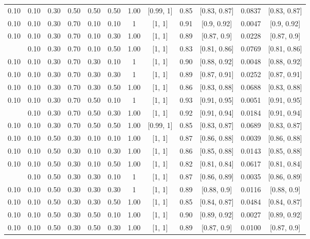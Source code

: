 \documentclass[
  11pt,
]{article}
\begin{document}
\begin{landscape}
\begin{ThreePartTable}
\begin{longtable}[t]{cccccccccccc}
0.10 & 0.10 & 0.30 & 0.50 & 0.50 & 0.50 & 1.00 & {}[0.99, 1] & 0.85 & {}[0.83, 0.87] & 0.0837 & {}[0.83, 0.87]\\
0.10 & 0.10 & 0.30 & 0.70 & 0.10 & 0.10 & 1 & {}[1, 1] & 0.91 & {}[0.9, 0.92] & 0.0047 & {}[0.9, 0.92]\\
0.10 & 0.10 & 0.30 & 0.70 & 0.10 & 0.30 & 1.00 & {}[1, 1] & 0.89 & {}[0.87, 0.9] & 0.0228 & {}[0.87, 0.9]\\
\addlinespace
0.10 & 0.10 & 0.30 & 0.70 & 0.10 & 0.50 & 1.00 & {}[1, 1] & 0.83 & {}[0.81, 0.86] & 0.0769 & {}[0.81, 0.86]\\
0.10 & 0.10 & 0.30 & 0.70 & 0.30 & 0.10 & 1 & {}[1, 1] & 0.90 & {}[0.88, 0.92] & 0.0048 & {}[0.88, 0.92]\\
0.10 & 0.10 & 0.30 & 0.70 & 0.30 & 0.30 & 1 & {}[1, 1] & 0.89 & {}[0.87, 0.91] & 0.0252 & {}[0.87, 0.91]\\
0.10 & 0.10 & 0.30 & 0.70 & 0.30 & 0.50 & 1.00 & {}[1, 1] & 0.86 & {}[0.83, 0.88] & 0.0688 & {}[0.83, 0.88]\\
0.10 & 0.10 & 0.30 & 0.70 & 0.50 & 0.10 & 1 & {}[1, 1] & 0.93 & {}[0.91, 0.95] & 0.0051 & {}[0.91, 0.95]\\
\addlinespace
0.10 & 0.10 & 0.30 & 0.70 & 0.50 & 0.30 & 1.00 & {}[1, 1] & 0.92 & {}[0.91, 0.94] & 0.0184 & {}[0.91, 0.94]\\
0.10 & 0.10 & 0.30 & 0.70 & 0.50 & 0.50 & 1.00 & {}[0.99, 1] & 0.85 & {}[0.83, 0.87] & 0.0689 & {}[0.83, 0.87]\\
0.10 & 0.10 & 0.50 & 0.30 & 0.10 & 0.10 & 1.00 & {}[1, 1] & 0.87 & {}[0.86, 0.88] & 0.0039 & {}[0.86, 0.88]\\
0.10 & 0.10 & 0.50 & 0.30 & 0.10 & 0.30 & 1.00 & {}[1, 1] & 0.86 & {}[0.85, 0.88] & 0.0143 & {}[0.85, 0.88]\\
0.10 & 0.10 & 0.50 & 0.30 & 0.10 & 0.50 & 1.00 & {}[1, 1] & 0.82 & {}[0.81, 0.84] & 0.0617 & {}[0.81, 0.84]\\
\addlinespace
0.10 & 0.10 & 0.50 & 0.30 & 0.30 & 0.10 & 1 & {}[1, 1] & 0.87 & {}[0.86, 0.89] & 0.0035 & {}[0.86, 0.89]\\
0.10 & 0.10 & 0.50 & 0.30 & 0.30 & 0.30 & 1 & {}[1, 1] & 0.89 & {}[0.88, 0.9] & 0.0116 & {}[0.88, 0.9]\\
0.10 & 0.10 & 0.50 & 0.30 & 0.30 & 0.50 & 1.00 & {}[1, 1] & 0.85 & {}[0.84, 0.87] & 0.0484 & {}[0.84, 0.87]\\
0.10 & 0.10 & 0.50 & 0.30 & 0.50 & 0.10 & 1.00 & {}[1, 1] & 0.90 & {}[0.89, 0.92] & 0.0027 & {}[0.89, 0.92]\\
0.10 & 0.10 & 0.50 & 0.30 & 0.50 & 0.30 & 1.00 & {}[1, 1] & 0.89 & {}[0.87, 0.9] & 0.0100 & {}[0.87, 0.9]\\

\end{longtable}
\end{ThreePartTable}
\end{landscape}
\end{document}
